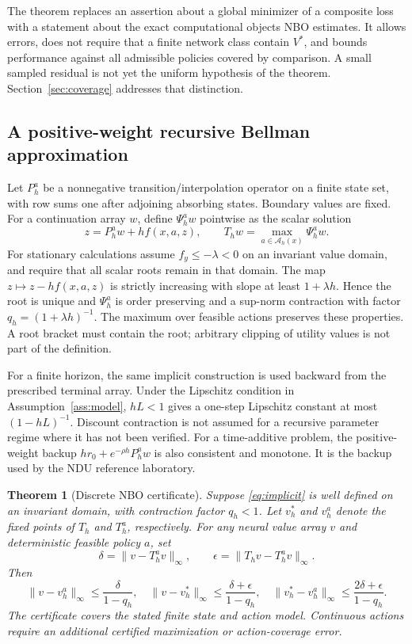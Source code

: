 \documentclass[ecta,draft]{econsocart}
\newtheorem{theorem}{Theorem}
\theoremstyle{definition}
\theoremstyle{remark}
\newcommand{\Act}{\mathcal A}
\begin{document}
The theorem replaces an assertion about a global minimizer of a composite loss with a statement about the exact computational objects NBO estimates. It allows errors, does not require that a finite network class contain $V^*$, and bounds performance against all admissible policies covered by comparison. A small sampled residual is not yet the uniform hypothesis of the theorem. Section~\ref{sec:coverage} addresses that distinction.

\subsection{A positive-weight recursive Bellman approximation}
Let $P_h^a$ be a nonnegative transition/interpolation operator on a finite state set, with row sums one after adjoining absorbing states. Boundary values are fixed. For a continuation array $w$, define $\Psi_h^a w$ pointwise as the scalar solution
\begin{equation}\label{eq:implicit}
 z=P_h^a w+h f(x,a,z),\qquad
 T_h w=\max_{a\in\Act_h(x)}\Psi_h^a w.
\end{equation}
For stationary calculations assume $f_y\leq-\lambda<0$ on an invariant value domain, and require that all scalar roots remain in that domain. The map $z\mapsto z-hf(x,a,z)$ is strictly increasing with slope at least $1+\lambda h$. Hence the root is unique and $\Psi_h^a$ is order preserving and a sup-norm contraction with factor $q_h=(1+\lambda h)^{-1}$. The maximum over feasible actions preserves these properties. A root bracket must contain the root; arbitrary clipping of utility values is not part of the definition.

For a finite horizon, the same implicit construction is used backward from the prescribed terminal array. Under the Lipschitz condition in Assumption~\ref{ass:model}, $hL<1$ gives a one-step Lipschitz constant at most $(1-hL)^{-1}$. Discount contraction is not assumed for a recursive parameter regime where it has not been verified. For a time-additive problem, the positive-weight backup $hr_0+e^{-\rho h}P_h^a w$ is also consistent and monotone. It is the backup used by the NDU reference laboratory.

\begin{theorem}[Discrete NBO certificate]\label{thm:discrete}
Suppose \eqref{eq:implicit} is well defined on an invariant domain, with contraction factor $q_h<1$. Let $v_h^*$ and $v_h^a$ denote the fixed points of $T_h$ and $T_h^a$, respectively. For any neural value array $v$ and deterministic feasible policy $a$, set
\[
 \delta=\|v-T_h^av\|_\infty,\qquad
 \epsilon=\|T_hv-T_h^av\|_\infty.
\]
Then
\begin{equation}\label{eq:discretebound}
 \|v-v_h^a\|_\infty\leq\frac\delta{1-q_h},\quad
 \|v-v_h^*\|_\infty\leq\frac{\delta+\epsilon}{1-q_h},\quad
 \|v_h^*-v_h^a\|_\infty\leq\frac{2\delta+\epsilon}{1-q_h}.
\end{equation}
The certificate covers the stated finite state and action model. Continuous actions require an additional certified maximization or action-coverage error.
\end{theorem}
\end{document}
